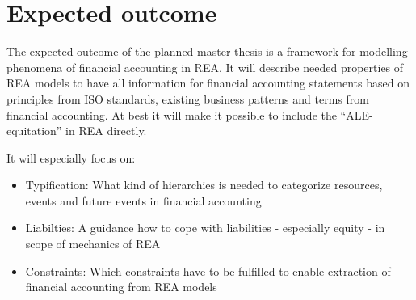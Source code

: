 







\section*{Expected outcome}

The expected outcome of the planned master thesis is a framework for modelling phenomena of financial accounting in REA.
It will describe needed properties of REA models to have all information for financial accounting statements based on principles from ISO standards, existing business patterns and terms from financial accounting.
At best it will make it possible to include the ``ALE-equitation'' in REA directly.

It will especially focus on:

\begin{itemize}
	\item Typification: What kind of hierarchies is needed to categorize resources, events and future events in financial accounting
	\item Liabilties: A guidance how to cope with liabilities - especially equity - in scope of mechanics of REA 
	\item Constraints: Which constraints have to be fulfilled to enable extraction of financial accounting from REA models
	
\end{itemize}

